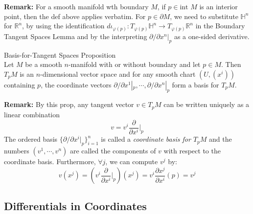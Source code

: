 \noindent\textbf{Remark:} For a smooth manifold wth boundary $M$, if $p\in \text{int }M$ is an interior point, then the def above applies verbatim. For $p\in \partial M$, we need to substitute $\mathbb{H}^n$ for $\mathbb{R}^n$, by using the identification $d\iota_{\varphi (p)}: T_{\varphi(p)} \mathbb{H}^n \to T_{\varphi(p)}\mathbb{R}^n$ in the Boundary Tangent Spaces Lemma and by the interpreting $\partial/ \partial x^n|_p$ as a one-sided derivative.

\begin{proposition}{Basis-for-Tangent Spaces Proposition}\\
Let $M$ be a smooth $n$-manifold with or without boundary and let $p\in M$. Then $T_pM$ is an $n$-dimensional vector space and for any smooth chart $(U, (x^i))$ containing $p$, the coordinate vectors $\partial/\partial x^1|_p, \cdots, \partial/\partial x^n|_p$ form a basis for $T_pM$.
\end{proposition}

\noindent\textbf{Remark:} By this prop, any tangent vector $v\in T_pM$ can be written uniquely as a linear combination
\[
v= v^i\frac{\partial}{\partial x^i}|_p
\]
The ordered basis $\{ \partial/ \partial x^i|_p\}_{i=1}^n$ is called a \textit{coordinate basis for $T_pM$} and the numbers $(v^1 ,\cdots, v^n)$ are called the components of $v$ with respect to the coordinate basis. Furthermore, $\forall j$, we can compute $v^j$ by:
\[
v(x^j)= (v^i\frac{\partial}{\partial x^i}|_p) (x^j)= v^i\frac{\partial x^j}{\partial x^i} (p) =v^j
\]

\subsection{Differentials in Coordinates}

